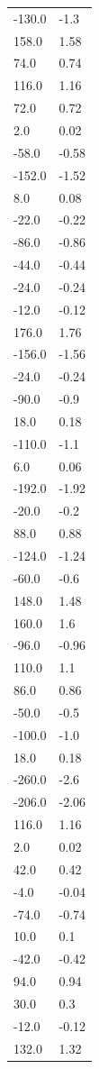 \begin{longtable}{ll}
-130.0 & -1.3 \\
158.0 & 1.58 \\
74.0 & 0.74 \\
116.0 & 1.16 \\
72.0 & 0.72 \\
2.0 & 0.02 \\
-58.0 & -0.58 \\
-152.0 & -1.52 \\
8.0 & 0.08 \\
-22.0 & -0.22 \\
-86.0 & -0.86 \\
-44.0 & -0.44 \\
-24.0 & -0.24 \\
-12.0 & -0.12 \\
176.0 & 1.76 \\
-156.0 & -1.56 \\
-24.0 & -0.24 \\
-90.0 & -0.9 \\
18.0 & 0.18 \\
-110.0 & -1.1 \\
6.0 & 0.06 \\
-192.0 & -1.92 \\
-20.0 & -0.2 \\
88.0 & 0.88 \\
-124.0 & -1.24 \\
-60.0 & -0.6 \\
148.0 & 1.48 \\
160.0 & 1.6 \\
-96.0 & -0.96 \\
110.0 & 1.1 \\
86.0 & 0.86 \\
-50.0 & -0.5 \\
-100.0 & -1.0 \\
18.0 & 0.18 \\
-260.0 & -2.6 \\
-206.0 & -2.06 \\
116.0 & 1.16 \\
2.0 & 0.02 \\
42.0 & 0.42 \\
-4.0 & -0.04 \\
-74.0 & -0.74 \\
10.0 & 0.1 \\
-42.0 & -0.42 \\
94.0 & 0.94 \\
30.0 & 0.3 \\
-12.0 & -0.12 \\
132.0 & 1.32 \\

\end{longtable}
